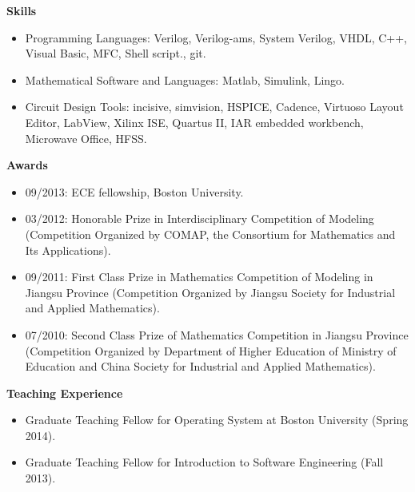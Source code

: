 \documentclass[]{article}
\begin{document}
\noindent \textbf{Skills}
\begin{itemize}
\item Programming Languages:  Verilog, Verilog-ams, System Verilog, VHDL, 
                                C++, Visual Basic, MFC, Shell script., git.
\item Mathematical Software and Languages:  Matlab, Simulink, Lingo.
\item Circuit Design Tools:  incisive, simvision, HSPICE, Cadence, Virtuoso
                                    Layout Editor, LabView, Xilinx ISE, Quartus
                                    II, IAR embedded workbench, Microwave
                                    Office, HFSS.
\end{itemize}
\noindent \textbf{Awards}
\begin{itemize}
\item 09/2013:  ECE fellowship, Boston University.

\item 03/2012:  Honorable Prize in Interdisciplinary Competition of Modeling
(Competition Organized by COMAP, the Consortium for Mathematics and Its
Applications).

\item 09/2011:  First Class Prize in Mathematics Competition of Modeling in
Jiangsu Province (Competition Organized by Jiangsu Society for Industrial and
Applied Mathematics).

\item 07/2010:  Second Class Prize of Mathematics Competition in Jiangsu
Province (Competition Organized by Department of Higher Education of Ministry
of Education and China Society for Industrial and Applied Mathematics).

\end{itemize}

\noindent \textbf{Teaching Experience}
\begin{itemize}
\item Graduate Teaching Fellow for Operating System at Boston University
(Spring 2014).
\item Graduate Teaching Fellow for Introduction to Software Engineering (Fall
2013).
\end{itemize}
\end{document}
